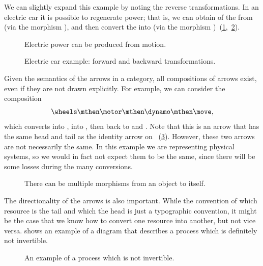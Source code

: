 We can slightly expand this example by noting the reverse transformations.
In an electric car it is possible to regenerate power; that is, we can obtain \rotationalmotion of the \wheels from \translationalmotion (via the morphism \move), and then convert the \rotationalmotion into \electricpower (via the morphism \dynamo)~(\cref{fig:e6},~\cref{fig:e6-together}).

\begin{figure}[h!]
    \centering
    \caption{Electric power can be produced from motion.}
    \label{fig:e6}
\end{figure}

\begin{figure}[h!]
    \centering
    \caption{Electric car example: forward and backward transformations.}
    \label{fig:e6-together}
\end{figure}

Given the semantics of the arrows in a category, all compositions of arrows exist, even if they are not drawn explicitly.
For example, we can consider the composition
%
\begin{equation}
    \wheels \mthen \motor \mthen \dynamo \mthen \move,
\end{equation}
%
which converts \translationalmotion into \rotationalmotion, into \electricpower, then back to \rotationalmotion and \translationalmotion.
Note that this is an arrow that has the same head and tail as the identity arrow on \translationalmotion~(\cref{fig:e8}).
However, these two arrows are not necessarily the same.
In this example we are representing physical systems, so we would in fact not expect them to be the same, since there will be some losses during the many conversions.

\begin{figure}[h!]
    \centering
    \caption{There can be multiple morphisms from an object to itself.}
    \label{fig:e8}
\end{figure}

The directionality of the arrows is also important.
While the convention of which resource is the tail and which the head is just a typographic convention, it might be the case that we know how to convert one resource into another, but not vice versa.
 shows an example of a diagram that describes a process which is definitely not invertible.

\begin{figure}[h!]
    \centering
    \caption{An example of a process which is not invertible. }
    \label{fig:e10}
\end{figure}

